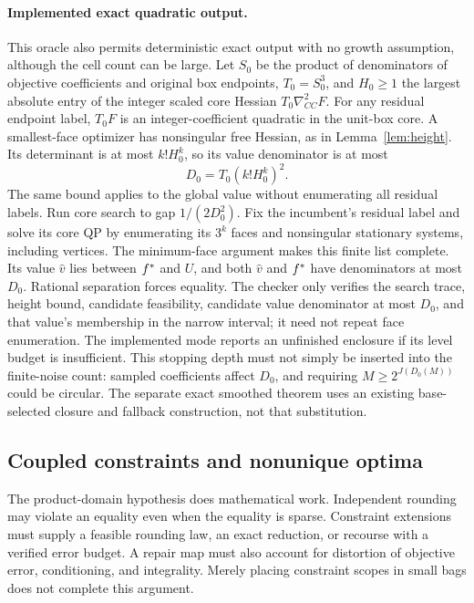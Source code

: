 \paragraph{Implemented exact quadratic output.}
This oracle also permits deterministic exact output with no growth
assumption, although the cell count can be large. Let $S_0$ be the product
of denominators of objective coefficients and original box endpoints,
$T_0=S_0^3$, and $H_0\ge1$ the largest absolute entry of the integer
scaled core Hessian $T_0\nabla^2_{CC}F$. For any residual endpoint label,
$T_0F$ is an integer-coefficient quadratic in the unit-box core. A
smallest-face optimizer has nonsingular free Hessian, as in
Lemma~\ref{lem:height}. Its determinant is at most $k!H_0^k$, so its
value denominator is at most
\[
D_0=T_0(k!H_0^k)^2.
\]
The same bound applies to the global value without enumerating all
residual labels. Run core search to gap $1/(2D_0^2)$. Fix the incumbent's
residual label and solve its core QP by enumerating its $3^k$ faces and
nonsingular stationary systems, including vertices. The minimum-face
argument makes this finite list complete. Its value $\widehat v$ lies
between $f^*$ and $U$, and both $\widehat v$ and $f^*$ have
denominators at most $D_0$. Rational separation forces equality.
The checker only verifies the search trace, height bound, candidate
feasibility, candidate value denominator at most $D_0$, and that value's
membership in the narrow interval; it need not repeat face
enumeration. The implemented mode reports an unfinished enclosure if its
level budget is insufficient. This stopping depth must not simply be
inserted into the finite-noise count: sampled coefficients affect $D_0$,
and requiring $M\ge2^{J(D_0(M))}$ could be circular. The separate exact
smoothed theorem uses an existing base-selected closure and fallback
construction, not that substitution.

\subsection{Coupled constraints and nonunique optima}
The product-domain hypothesis does mathematical work. Independent
rounding may violate an equality even when the equality is sparse.
Constraint extensions must supply a feasible rounding law, an exact
reduction, or recourse with a verified error budget. A repair map must
also account for distortion of objective error, conditioning, and
integrality. Merely placing constraint scopes in small bags does not
complete this argument.

